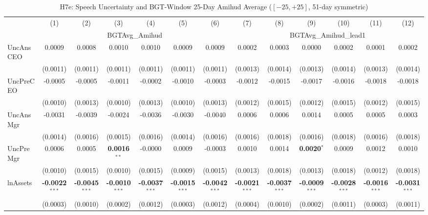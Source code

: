 \begin{landscape}
\begin{table}[H]
\setlength{\tabcolsep}{3pt}
\renewcommand{\arraystretch}{0.85}
\centering
\caption{H7e: Speech Uncertainty and BGT-Window 25-Day Amihud Average ($[-25,+25]$, 51-day symmetric)}
\label{tab:h7e}
\scriptsize
\begin{tabular}{lcccccccccccc}
\toprule
 & (1) & (2) & (3) & (4) & (5) & (6) & (7) & (8) & (9) & (10) & (11) & (12) \\
 & \multicolumn{6}{c}{BGTAvg\_Amihud} & \multicolumn{6}{c}{BGTAvg\_Amihud\_lead1} \\
\cmidrule(lr){2-7} \cmidrule(lr){8-13}
\midrule
UncAnsCEO & 0.0009 & 0.0008 & 0.0010 & 0.0010 & 0.0009 & 0.0009 & 0.0002 & 0.0003 & 0.0000 & 0.0002 & 0.0001 & 0.0002 \\
 & (0.0011) & (0.0011) & (0.0011) & (0.0011) & (0.0011) & (0.0011) & (0.0013) & (0.0014) & (0.0013) & (0.0014) & (0.0013) & (0.0014) \\
UncPreCEO & -0.0005 & -0.0005 & -0.0011 & -0.0002 & -0.0010 & -0.0003 & -0.0012 & -0.0015 & -0.0017 & -0.0016 & -0.0018 & -0.0018 \\
 & (0.0010) & (0.0013) & (0.0010) & (0.0013) & (0.0010) & (0.0013) & (0.0012) & (0.0015) & (0.0012) & (0.0015) & (0.0012) & (0.0015) \\
UncAnsMgr & -0.0031 & -0.0039 & -0.0024 & -0.0036 & -0.0030 & -0.0040 & 0.0006 & 0.0006 & 0.0014 & 0.0005 & 0.0005 & 0.0003 \\
 & (0.0014) & (0.0016) & (0.0015) & (0.0016) & (0.0014) & (0.0016) & (0.0016) & (0.0018) & (0.0016) & (0.0018) & (0.0016) & (0.0018) \\
UncPreMgr & 0.0006 & 0.0005 & \textbf{0.0016}$^{**}$ & -0.0000 & 0.0009 & -0.0003 & 0.0010 & 0.0014 & \textbf{0.0020}$^{*}$ & 0.0009 & 0.0012 & 0.0010 \\
 & (0.0010) & (0.0015) & (0.0010) & (0.0015) & (0.0009) & (0.0015) & (0.0013) & (0.0018) & (0.0013) & (0.0018) & (0.0012) & (0.0018) \\
\midrule
lnAssets & \textbf{-0.0022}$^{***}$ & \textbf{-0.0045}$^{***}$ & \textbf{-0.0010}$^{***}$ & \textbf{-0.0037}$^{***}$ & \textbf{-0.0015}$^{***}$ & \textbf{-0.0042}$^{***}$ & \textbf{-0.0021}$^{***}$ & \textbf{-0.0037}$^{***}$ & \textbf{-0.0009}$^{***}$ & \textbf{-0.0028}$^{***}$ & \textbf{-0.0016}$^{***}$ & \textbf{-0.0031}$^{***}$ \\
 & (0.0003) & (0.0010) & (0.0002) & (0.0012) & (0.0003) & (0.0012) & (0.0004) & (0.0010) & (0.0002) & (0.0011) & (0.0003) & (0.0011) \\

\end{tabular}
\end{table}
\end{landscape}
